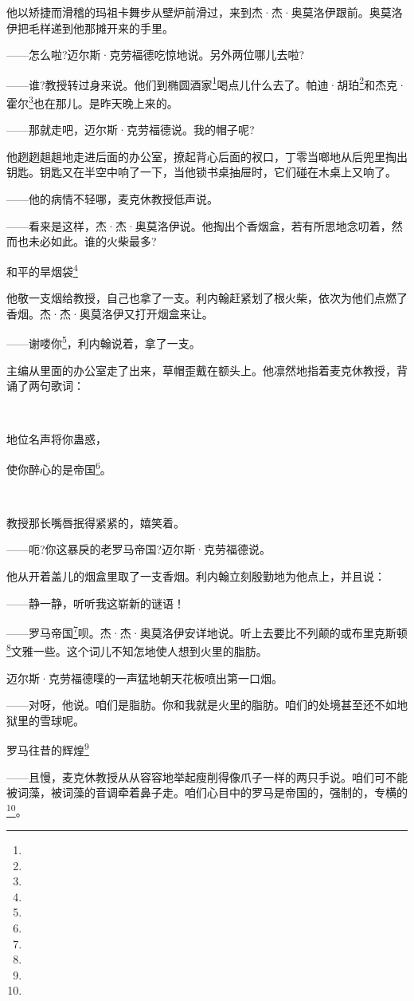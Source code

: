 \par 他以矫捷而滑稽的玛祖卡舞步从壁炉前滑过，来到杰·杰·奥莫洛伊跟前。奥莫洛伊把毛样递到他那摊开来的手里。
\par ——怎么啦?迈尔斯·克劳福德吃惊地说。另外两位哪儿去啦?
\par ——谁?教授转过身来说。他们到椭圆酒家\footnote{}喝点儿什么去了。帕迪·胡珀\footnote{}和杰克·霍尔\footnote{}也在那儿。是昨天晚上来的。
\par ——那就走吧，迈尔斯·克劳福德说。我的帽子呢?
\par 他趔趔趄趄地走进后面的办公室，撩起背心后面的衩口，丁零当啷地从后兜里掏出钥匙。钥匙又在半空中响了一下，当他锁书桌抽屉时，它们碰在木桌上又响了。
\par ——他的病情不轻哪，麦克休教授低声说。
\par ——看来是这样，杰·杰·奥莫洛伊说。他掏出个香烟盒，若有所思地念叨着，然而也未必如此。谁的火柴最多?
\par 和平的旱烟袋\footnote{}
\par 他敬一支烟给教授，自己也拿了一支。利内翰赶紧划了根火柴，依次为他们点燃了香烟。杰·杰·奥莫洛伊又打开烟盒来让。
\par ——谢喽你\footnote{}，利内翰说着，拿了一支。
\par 主编从里面的办公室走了出来，草帽歪戴在额头上。他凛然地指着麦克休教授，背诵了两句歌词：
\par  
\par 地位名声将你蛊惑，
\par 使你醉心的是帝国\footnote{}。
\par  
\par 教授那长嘴唇抿得紧紧的，嬉笑着。
\par ——呃?你这暴戾的老罗马帝国?迈尔斯·克劳福德说。
\par 他从开着盖儿的烟盒里取了一支香烟。利内翰立刻殷勤地为他点上，并且说：
\par ——静一静，听听我这崭新的谜语！
\par ——罗马帝国\footnote{}呗。杰·杰·奥莫洛伊安详地说。听上去要比不列颠的或布里克斯顿\footnote{}文雅一些。这个词儿不知怎地使人想到火里的脂肪。
\par 迈尔斯·克劳福德噗的一声猛地朝天花板喷出第一口烟。
\par ——对呀，他说。咱们是脂肪。你和我就是火里的脂肪。咱们的处境甚至还不如地狱里的雪球呢。
\par 罗马往昔的辉煌\footnote{}
\par ——且慢，麦克休教授从从容容地举起瘦削得像爪子一样的两只手说。咱们可不能被词藻，被词藻的音调牵着鼻子走。咱们心目中的罗马是帝国的，强制的，专横的\footnote{}。
